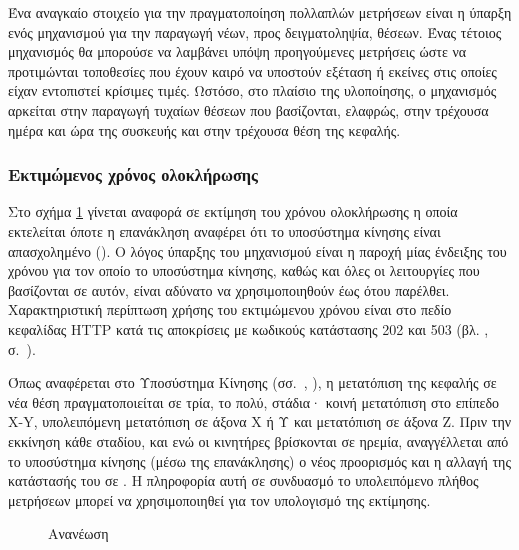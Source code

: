 \begin{figure}
    \caption{
    \label{fig:task:samples}}
\end{figure}

Ένα αναγκαίο στοιχείο για την πραγματοποίηση πολλαπλών μετρήσεων είναι η ύπαρξη
ενός μηχανισμού για την παραγωγή νέων, προς δειγματοληψία, θέσεων. Ένας τέτοιος
μηχανισμός θα μπορούσε να λαμβάνει υπόψη προηγούμενες μετρήσεις ώστε να
προτιμώνται τοποθεσίες που έχουν καιρό να υποστούν εξέταση ή εκείνες στις οποίες
είχαν εντοπιστεί κρίσιμες τιμές. Ωστόσο, στο πλαίσιο της υλοποίησης, ο
μηχανισμός αρκείται στην παραγωγή τυχαίων θέσεων που βασίζονται, ελαφρώς, στην
τρέχουσα ημέρα και ώρα της συσκευής
και στην τρέχουσα θέση της κεφαλής.


\subsubsection{Εκτιμώμενος χρόνος ολοκλήρωσης}

Στο σχήμα \ref{fig:task:samples} γίνεται αναφορά σε εκτίμηση του χρόνου
ολοκλήρωσης η οποία εκτελείται όποτε η επανάκληση αναφέρει ότι το υποσύστημα
κίνησης είναι απασχολημένο (). Ο λόγος ύπαρξης του μηχανισμού είναι η
παροχή μίας ένδειξης του χρόνου για τον οποίο το υποσύστημα κίνησης, καθώς και
όλες οι λειτουργίες που βασίζονται σε αυτόν, είναι αδύνατο να χρησιμοποιηθούν
έως ότου παρέλθει. Χαρακτηριστική περίπτωση χρήσης του εκτιμώμενου χρόνου είναι
στο πεδίο κεφαλίδας HTTP  κατά τις αποκρίσεις με κωδικούς
κατάστασης 202 και 503 (βλ. ,
σ.~\pageref{sec:network:impl-resources}).

Όπως αναφέρεται στο Υποσύστημα Κίνησης
(σσ.~\pageref{ssubsec:motor:routing},%
\pageref{ssubsec:motor:common-translation}),
η μετατόπιση της κεφαλής σε νέα θέση πραγματοποιείται σε τρία, το πολύ, στάδια·
κοινή μετατόπιση στο επίπεδο X-Y, υπολειπόμενη μετατόπιση σε άξονα X ή Υ και
μετατόπιση σε άξονα Z. Πριν την εκκίνηση κάθε σταδίου, και ενώ οι κινητήρες
βρίσκονται σε ηρεμία, αναγγέλλεται από το υποσύστημα κίνησης (μέσω της
επανάκλησης) ο νέος προορισμός και η αλλαγή της κατάστασής του σε . Η
πληροφορία αυτή σε συνδυασμό το υπολειπόμενο πλήθος μετρήσεων μπορεί να
χρησιμοποιηθεί για τον υπολογισμό της εκτίμησης.

\begin{figure}
    \caption{Ανανέωση 
    \label{fig:task:estimate-update}}
    \begin{center}
    \end{center}
\end{figure}

